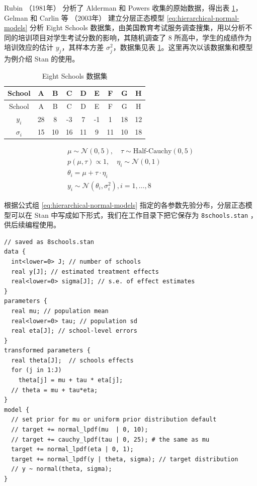 \documentclass[12pt,a4paper,UTF8,twoside]{book}
\theoremstyle{definition}
\theoremstyle{definition}
\theoremstyle{definition}
\theoremstyle{remark}
\begin{document}
Rubin （1981年） \citep{Rubin1981} 分析了 Alderman 和 Powers
\citep{Alderman1980} 收集的原始数据，得出表
\ref{tab:eight-high-schools}， Gelman 和 Carlin 等 （2003年）
\citep{Gelman2003} 建立分层正态模型 \eqref{eq:hierarchical-normal-models}
分析 Eight Schools
数据集，由美国教育考试服务调查搜集，用以分析不同的培训项目对学生考试分数的影响，其随机调查了
8 所高中，学生的成绩作为培训效应的估计 \(y_j\)，其样本方差
\(\sigma^2_j\)，数据集见表
\ref{tab:eight-high-schools}。这里再次以该数据集和模型为例介绍 Stan
的使用。

\begin{longtable}[]{@{}ccccccccc@{}}
\caption{\label{tab:eight-high-schools} Eight Schools 数据集}\tabularnewline
\toprule
School & A & B & C & D & E & F & G & H\tabularnewline
\midrule
\endfirsthead
\toprule
School & A & B & C & D & E & F & G & H\tabularnewline
\midrule
\endhead
\(y_i\) & 28 & 8 & -3 & 7 & -1 & 1 & 18 & 12\tabularnewline
\(\sigma_i\) & 15 & 10 & 16 & 11 & 9 & 11 & 10 & 18\tabularnewline
\bottomrule
\end{longtable}

\begin{equation}
\begin{aligned}
    \mu \sim \mathcal{N}(0,5), \quad \tau \sim \text{Half-Cauchy}(0,5) \\
    p(\mu,\tau) \propto 1, \quad \eta_i \sim \mathcal{N}(0,1) \\
    \theta_i  =   \mu + \tau \cdot \eta_i \\
    y_i \sim \mathcal{N}(\theta_i,\sigma^2_{i}), i = 1,\ldots,8
\end{aligned}
\label{eq:hierarchical-normal-models}
\end{equation}

根据公式组 \eqref{eq:hierarchical-normal-models}
指定的各参数先验分布，分层正态模型可以在 Stan
中写成如下形式，我们在工作目录下把它保存为 \texttt{8schools.stan}
，供后续编程使用。

\begin{verbatim}
// saved as 8schools.stan
data {
  int<lower=0> J; // number of schools 
  real y[J]; // estimated treatment effects
  real<lower=0> sigma[J]; // s.e. of effect estimates 
}
parameters {
  real mu; // population mean
  real<lower=0> tau; // population sd
  real eta[J]; // school-level errors
}
transformed parameters {
  real theta[J];  // schools effects
  for (j in 1:J)
    theta[j] = mu + tau * eta[j];
  // theta = mu + tau*eta;
}
model {
  // set prior for mu or uniform prior distribution default
  // target += normal_lpdf(mu  | 0, 10); 
  // target += cauchy_lpdf(tau | 0, 25); # the same as mu
  target += normal_lpdf(eta | 0, 1);
  target += normal_lpdf(y | theta, sigma); // target distribution
  // y ~ normal(theta, sigma);
}
\end{verbatim}
\end{document}
